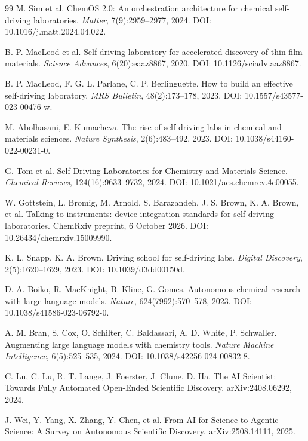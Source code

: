 \documentclass[11pt]{article}
\begin{document}
\begin{thebibliography}{99}
 M. Sim et al. ChemOS 2.0: An orchestration architecture for chemical
self-driving laboratories. \emph{Matter}, 7(9):2959--2977, 2024.
DOI: 10.1016/j.matt.2024.04.022.

 B. P. MacLeod et al. Self-driving laboratory for accelerated
discovery of thin-film materials. \emph{Science Advances}, 6(20):eaaz8867, 2020.
DOI: 10.1126/sciadv.aaz8867.

 B. P. MacLeod, F. G. L. Parlane, C. P. Berlinguette. How to build an
effective self-driving laboratory. \emph{MRS Bulletin}, 48(2):173--178, 2023.
DOI: 10.1557/s43577-023-00476-w.

 M. Abolhasani, E. Kumacheva. The rise of self-driving labs in
chemical and materials sciences. \emph{Nature Synthesis}, 2(6):483--492, 2023.
DOI: 10.1038/s44160-022-00231-0.

 G. Tom et al. Self-Driving Laboratories for Chemistry and Materials
Science. \emph{Chemical Reviews}, 124(16):9633--9732, 2024.
DOI: 10.1021/acs.chemrev.4c00055.

 W. Gottstein, L. Bromig, M. Arnold, S. Barazandeh, J. S. Brown,
K. A. Brown, et al. Talking to instruments: device-integration standards for self-driving
laboratories. ChemRxiv preprint, 6 October 2026. DOI: 10.26434/chemrxiv.15009990.

 K. L. Snapp, K. A. Brown. Driving school for self-driving labs.
\emph{Digital Discovery}, 2(5):1620--1629, 2023. DOI: 10.1039/d3dd00150d.

 D. A. Boiko, R. MacKnight, B. Kline, G. Gomes. Autonomous chemical
research with large language models. \emph{Nature}, 624(7992):570--578, 2023.
DOI: 10.1038/s41586-023-06792-0.

 A. M. Bran, S. Cox, O. Schilter, C. Baldassari, A. D. White,
P. Schwaller. Augmenting large language models with chemistry tools. \emph{Nature Machine
Intelligence}, 6(5):525--535, 2024. DOI: 10.1038/s42256-024-00832-8.

 C. Lu, C. Lu, R. T. Lange, J. Foerster, J. Clune, D. Ha. The AI Scientist:
Towards Fully Automated Open-Ended Scientific Discovery. arXiv:2408.06292, 2024.

 J. Wei, Y. Yang, X. Zhang, Y. Chen, et al. From AI for Science to Agentic
Science: A Survey on Autonomous Scientific Discovery. arXiv:2508.14111, 2025.


\end{thebibliography}
\end{document}

